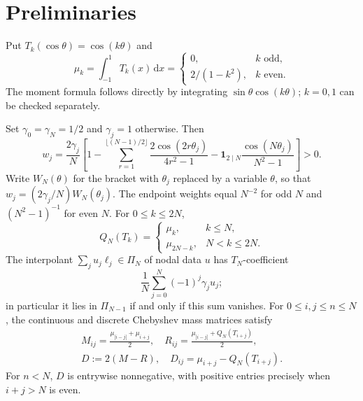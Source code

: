 \documentclass{siamart251216}
\newcommand{\Pn}{\Pi}
\newcommand{\dd}{\,\mathrm d}
\begin{document}
\section{Preliminaries}\label{sec:prelim}

Put $T_k(\cos\theta)=\cos(k\theta)$ and
\[
 \mu_k=\int_{-1}^1T_k(x)\dd x
 =\begin{cases}0,&k\text{ odd},\\2/(1-k^2),&k\text{ even}.
 \end{cases}
\]
The moment formula follows directly by integrating
$\sin\theta\cos(k\theta)$; $k=0,1$ can be checked separately.

\begin{lemma}\label{lem:identities}%
Set $\gamma_0=\gamma_N=1/2$ and $\gamma_j=1$ otherwise. Then
\begin{equation}\label{eq:weights}
 w_j=\frac{2\gamma_j}{N}\left[
 1-\sum_{r=1}^{\lfloor(N-1)/2\rfloor}
      \frac{2\cos(2r\theta_j)}{4r^2-1}
 -\boldsymbol1_{2\mid N}\frac{\cos(N\theta_j)}{N^2-1}
 \right]>0.
\end{equation}
Write $W_N(\theta)$ for the bracket with $\theta_j$ replaced by a variable
$\theta$, so that $w_j=(2\gamma_j/N)W_N(\theta_j)$.
The endpoint weights equal $N^{-2}$ for odd $N$ and $(N^2-1)^{-1}$
for even $N$. For $0\le k\le2N$,
\begin{equation}\label{eq:alias}
 Q_N(T_k)=\begin{cases}\mu_k,&k\le N,\\\mu_{2N-k},&N<k\le2N.
 \end{cases}
\end{equation}
The interpolant $\sum_ju_j\ell_j\in\Pn_N$ of nodal data $u$ has
$T_N$-coefficient
\begin{equation}\label{eq:topcoeff}
 \frac1N\sum_{j=0}^N(-1)^j\gamma_ju_j;
\end{equation}
in particular it lies in $\Pn_{N-1}$ if and only if this sum vanishes.
For $0\le i,j\le n\le N$, the continuous and discrete Chebyshev
mass matrices satisfy
\begin{equation}\label{eq:mass}
\begin{gathered}
 M_{ij}=\frac{\mu_{|i-j|}+\mu_{i+j}}2,\quad
 R_{ij}=\frac{\mu_{|i-j|}+Q_N(T_{i+j})}2,\\
 D:=2(M-R),\quad D_{ij}=\mu_{i+j}-Q_N(T_{i+j}).
\end{gathered}
\end{equation}
For $n<N$, $D$ is entrywise nonnegative, with positive entries precisely
when $i+j>N$ is even.
\end{lemma}
\end{document}
